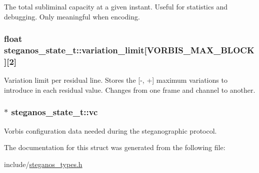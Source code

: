 \label{structsteganos__state__t_ae8215dc4cb883543dd4bd7a47a475d74}
The total subliminal capacity at a given instant. Useful for statistics and debugging. Only meaningful when encoding. \hypertarget{structsteganos__state__t_a5382346902b6d6567614b77d9a0c6de3}{
\subsubsection[{variation\_\-limit}]{\setlength{\rightskip}{0pt plus 5cm}float {\bf steganos\_\-state\_\-t::variation\_\-limit}\mbox{[}VORBIS\_\-MAX\_\-BLOCK\mbox{]}\mbox{[}2\mbox{]}}}
\label{structsteganos__state__t_a5382346902b6d6567614b77d9a0c6de3}
Variation limit per residual line. Stores the \mbox{[}-\/, +\mbox{]} maximum variations to introduce in each residual value. Changes from one frame and channel to another. \hypertarget{structsteganos__state__t_ade7b06cf61e74c7684a3eb9822e51ada}{
\subsubsection[{vc}]{$\ast$ {\bf steganos\_\-state\_\-t::vc}}}
\label{structsteganos__state__t_ade7b06cf61e74c7684a3eb9822e51ada}
Vorbis configuration data needed during the steganographic protocol. 

The documentation for this struct was generated from the following file:\begin{DoxyCompactItemize}
\item 
include/\hyperlink{steganos__types_8h}{steganos\_\-types.h}\end{DoxyCompactItemize}
